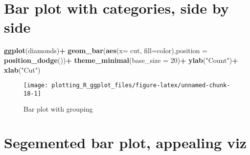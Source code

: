 \documentclass[
]{book}
\newenvironment{Shaded}{\begin{snugshade}}{\end{snugshade}}
\newcommand{\DataTypeTok}[1]{\textcolor[rgb]{0.13,0.29,0.53}{#1}}
\newcommand{\DecValTok}[1]{\textcolor[rgb]{0.00,0.00,0.81}{#1}}
\newcommand{\KeywordTok}[1]{\textcolor[rgb]{0.13,0.29,0.53}{\textbf{#1}}}
\newcommand{\NormalTok}[1]{#1}
\newcommand{\OperatorTok}[1]{\textcolor[rgb]{0.81,0.36,0.00}{\textbf{#1}}}
\newcommand{\StringTok}[1]{\textcolor[rgb]{0.31,0.60,0.02}{#1}}
\begin{document}
\hypertarget{bar-plot-with-categories-side-by-side}{%
\section{Bar plot with categories, side by side}\label{bar-plot-with-categories-side-by-side}}

\begin{Shaded}
\begin{Highlighting}[]
\KeywordTok{ggplot}\NormalTok{(diamonds)}\OperatorTok{+}
\StringTok{ }\KeywordTok{geom_bar}\NormalTok{(}\KeywordTok{aes}\NormalTok{(}\DataTypeTok{x=}\NormalTok{ cut, }\DataTypeTok{fill=}\NormalTok{color),}\DataTypeTok{position =} \KeywordTok{position_dodge}\NormalTok{())}\OperatorTok{+}
\StringTok{  }\KeywordTok{theme_minimal}\NormalTok{(}\DataTypeTok{base_size =} \DecValTok{20}\NormalTok{)}\OperatorTok{+}
\StringTok{  }\KeywordTok{ylab}\NormalTok{(}\StringTok{"Count"}\NormalTok{)}\OperatorTok{+}\StringTok{ }\KeywordTok{xlab}\NormalTok{(}\StringTok{"Cut"}\NormalTok{)}
\end{Highlighting}
\end{Shaded}

\begin{figure}

{\centering \texttt{[image: plotting\_R\_ggplot\_files/figure-latex/unnamed-chunk-18-1]} 

}

\caption{Bar plot with grouping}\label{fig:unnamed-chunk-18}
\end{figure}

\hypertarget{segemented-bar-plot-appealing-viz}{%
\section{Segemented bar plot, appealing viz}\label{segemented-bar-plot-appealing-viz}}
\end{document}
